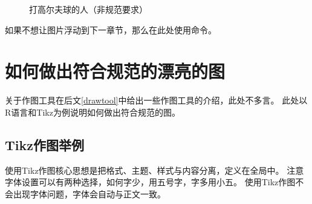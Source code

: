 \begin{figure}[!h]
	\centering
	\begin{sideways}
		\begin{minipage}{\textheight}
			\centering
			\caption{打高尔夫球的人（非规范要求）}
		\end{minipage}
	\end{sideways}
\end{figure}

\clearpage

如果不想让图片浮动到下一章节，那么在此处使用命令。

\section{如何做出符合规范的漂亮的图}
关于作图工具在后文\ref{drawtool}中给出一些作图工具的介绍，此处不多言。
此处以R语言和Tikz为例说明如何做出符合规范的图。

\subsection{Tikz作图举例}
使用Tikz作图核心思想是把格式、主题、样式与内容分离，定义在全局中。
注意字体设置可以有两种选择，如何字少，用五号字，字多用小五。
使用Tikz作图不会出现字体问题，字体会自动与正文一致。

